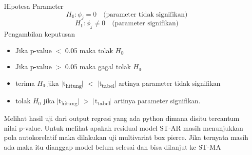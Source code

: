 \begin{enumerate}
\begin{enumerate}[label=\alph*)]
\begin{enumerate}[label=\roman*)]
            Hipotesa Parameter
            \begin{equation}\label{st_ar_hipotesa0}
                H_0 : \phi_j = 0 \quad \text{(parameter tidak signifikan)}
            \end{equation}\label{st_ar_hipotesa1}
            \begin{equation}
                H_1 : \phi_j \neq 0 \quad \text{(parameter signifikan)}
            \end{equation}
            Pengambilan keputusan
            \begin{itemize}
                \item Jika p-value $<$ 0.05 maka tolak $H_0$
                \item Jika p-value $>$ 0.05 maka gagal tolak $H_0$
                \item terima $H_0$ jika $|$t\textsubscript{hitung}$|$ $<$ $|$t\textsubscript{tabel}$|$ artinya parameter tidak signifikan
                \item tolak $H_0$ jika $|$t\textsubscript{hitung}$|$ $>$ $|$t\textsubscript{tabel}$|$ artinya parameter signifikan.
            \end{itemize}
            Melihat hasil uji dari output regresi yang ada python dimana disitu tercantum nilai p-value.
            Untuk melihat apakah residual model ST-AR masih menunjukkan pola autokorelatif maka dilakukan uji multivariat box pierce. Jika ternyata masih ada maka itu dianggap model belum selesai dan bisa dilanjut ke ST-MA
        \end{enumerate}


\end{enumerate}
\end{enumerate}
